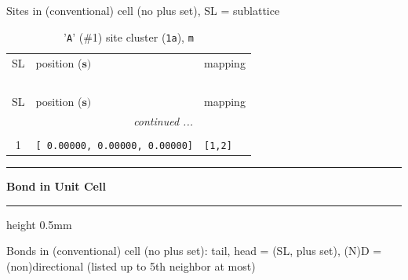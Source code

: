 \documentclass[fleqn,10pt,landscape]{jsarticle}
\begin{document}
\noindent Sites in (conventional) cell (no plus set), SL = sublattice

\renewcommand{\arraystretch}{1.6}
\begin{longtable}[l]{cll}
\captionsetup{justification=raggedright, singlelinecheck=off}
\caption{'\texttt{A}' (\#1) site cluster (\texttt{1a}), \texttt{m}}
 \\
 \hline \hline
SL & position ($\bm{s})$ & mapping \\ \hline \endfirsthead

\multicolumn{2}{l}{\tablename\ \thetable{}} \\
 \hline \hline
SL & position ($\bm{s})$ & mapping \\ \hline \endhead

 \hline \hline
\multicolumn{2}{r}{\footnotesize\it continued ...} \\ \endfoot

 \hline \hline
\multicolumn{2}{r}{} \\ \endlastfoot

1 & \texttt{[ 0.00000, 0.00000, 0.00000]} & \texttt{[1,2]} \\
\end{longtable}
\vspace{5mm}
\noindent \rule[0.5mm]{5mm}{0.5mm}\hspace{3mm}\textbf{Bond in Unit Cell}\hspace{3mm}\leaders\hrule height 0.5mm\hfill\kern0pt
\vspace{3mm}

\noindent Bonds in (conventional) cell (no plus set): tail, head = (SL, plus set), (N)D = (non)directional (listed up to 5th neighbor at most)
\end{document}
